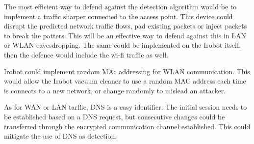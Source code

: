 The most efficient way to defend against the detection algorithm would be to implement a traffic sharper connected to the access point. This device could disrupt the predicted network traffic flows, pad existing packets or inject packets to break the patters. This will be an effective way to defend against this in LAN or WLAN eavesdropping. The same could be implemented on the Irobot itself, then the defence would include the wi-fi traffic as well. 

Irobot could implement random MAc addressing \cite{random_mac_bernardos2020rfc} for WLAN communication. This would allow the Irobot vacuum cleaner to use a random MAC address each time is connects to a new network, or change randomly to mislead an attacker. 

As for WAN or LAN tarffic, DNS is a easy identifier. The initial session needs to be established based on a DNS request, but consecutive changes could be transferred through the encrypted communication channel established. This could mitigate the use of DNS as detection. 



